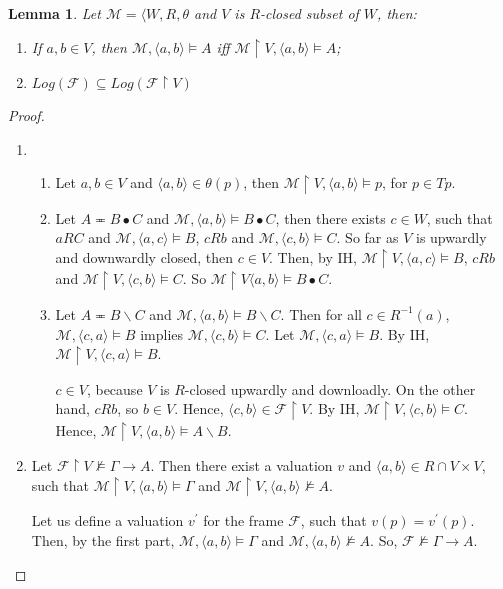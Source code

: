 \documentclass[a4paper]{article}
\theoremstyle{defin}
\theoremstyle{theorem}
\theoremstyle{prop}
\theoremstyle{lemma}
\newtheorem{lemma}{Lemma}
\theoremstyle{ex}
\theoremstyle{col}
\begin{document}
\begin{lemma}
  Let $\mathcal{M} = \langle W, R, \theta$ and $V$ is $R$-closed subset of $W$, then:
  \begin{enumerate}
    \item If $a, b \in V$, then $\mathcal{M}, \langle a, b \rangle \models A$ iff $\mathcal{M} \restriction V, \langle a, b \rangle \models A$;
    \item $Log(\mathcal{F}) \subseteq Log(\mathcal{F} \restriction V)$
  \end{enumerate}
\end{lemma}

\begin{proof}
  $ $
  \begin{enumerate}
    \item
    \begin{enumerate}
      \item Let $a, b \in V$ and $\langle a, b \rangle \in \theta(p)$, then $\mathcal{M} \restriction V, \langle a, b \rangle \models p$, for $p \in Tp$.
      \item Let $A \eqcirc B \bullet C$ and $\mathcal{M}, \langle a, b \rangle \models B \bullet C$, then
      there exists $c \in W$, such that $a R C$ and $\mathcal{M}, \langle a, c \rangle \models B$, $c R b$ and $\mathcal{M}, \langle c, b \rangle \models C$.
      So far as $V$ is upwardly and downwardly closed, then $c \in V$. Then, by IH, $\mathcal{M} \restriction V , \langle a, c \rangle \models B$, $c R b$ and
      $\mathcal{M} \restriction V, \langle c, b \rangle \models C$. So $\mathcal{M} \restriction V \langle a, b \rangle \models B \bullet C$.
      \item Let $A \eqcirc B \backslash C$ and $\mathcal{M}, \langle a, b \rangle \models B \backslash C$. Then for all $c \in R^{-1}(a)$, $\mathcal{M},
      \langle c, a \rangle \models B$ implies $\mathcal{M}, \langle c, b \rangle \models C$. Let $\mathcal{M}, \langle c, a \rangle \models B$.
      By IH, $\mathcal{M} \restriction V, \langle c, a \rangle \models B$.

      $c \in V$, because $V$ is $R$-closed upwardly and downloadly. On the other hand, $c R b$, so $b \in V$. Hence,
      $\langle c, b \rangle \in \mathcal{F} \restriction V$. By IH, $\mathcal{M} \restriction V, \langle c, b \rangle \models C$. Hence,
      $\mathcal{M} \restriction V, \langle a, b \rangle \models A \backslash B$.
    \end{enumerate}
    \item Let $\mathcal{F} \restriction V\not\models \Gamma \to A$. Then there exist a valuation $v$ and $\langle a, b \rangle \in R \cap V \times V$,
    such that $\mathcal{M} \restriction V, \langle a,b \rangle \models \Gamma$ and $\mathcal{M} \restriction V, \langle a,b \rangle\not\models A$.

    Let us define a valuation $v^{'}$ for the frame $\mathcal{F}$, such that $v(p) = v^{'}(p)$. Then, by the first part, $\mathcal{M}, \langle a, b \rangle \models \Gamma$ and $\mathcal{M}, \langle a, b\rangle\not\models A$. So, $\mathcal{F}\not\models \Gamma \to A$.
  \end{enumerate}
\end{proof}
\end{document}
